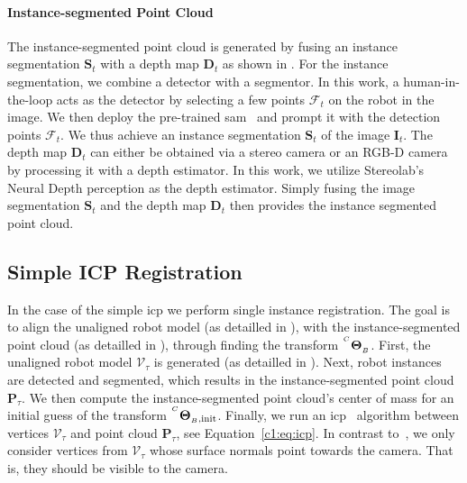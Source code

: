\paragraph{Instance-segmented Point Cloud}
\label{c1:sec:instance_segmented_point_cloud}
The instance-segmented point cloud is generated by fusing an instance segmentation $\mathbf{S}_t$ with a depth map $\mathbf{D}_t$ as shown in . For the instance segmentation, we combine a detector with a segmentor. In this work, a human-in-the-loop acts as the detector by selecting a few points $\mathcal{F}_t$ on the robot in the image. We then deploy the pre-trained \gls{sam}~\cite{Kirillov:arxiv:2023} and prompt it with the detection points $\mathcal{F}_t$. We thus achieve an instance segmentation $\mathbf{S}_t$ of the image $\mathbf{I}_t$. The depth map $\mathbf{D}_t$ can either be obtained via a stereo camera or an RGB-D camera by processing it with a depth estimator. In this work, we utilize Stereolab's Neural Depth perception as the depth estimator. Simply fusing the image segmentation $\mathbf{S}_t$ and the depth map $\mathbf{D}_t$ then provides the instance segmented point cloud.



\subsection{Simple ICP Registration}
\label{c1:sec:simple_icp_registration}
In the case of the simple \gls{icp} we perform single instance registration. The goal is to align the unaligned robot model (as detailled in ), with the instance-segmented point cloud (as detailled in ), through finding the transform ${}^{^C}\mathbf{\Theta}_{_B}$. First, the unaligned robot model $\mathcal{V}_\tau$ is generated (as detailled in ). Next, robot instances are detected and segmented, which results in the instance-segmented point cloud $\mathbf{P}_\tau$. We then compute the instance-segmented point cloud's center of mass for an initial guess of the transform ${}^{^{C}}\mathbf{\Theta}_{_B,\text{init}}$. Finally, we run an \gls{icp}~\cite{simple_icp} algorithm between vertices $\mathcal{V}_\tau$ and point cloud $\mathbf{P}_\tau$, see Equation~\ref{c1:eq:icp}. In contrast to~\cite{simple_icp}, we only consider vertices from $\mathcal{V}_\tau$ whose surface normals point towards the camera. That is, they should be visible to the camera.

